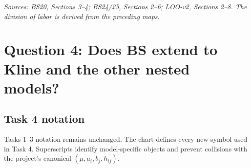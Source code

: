 \documentclass[11pt]{article}
\begin{document}
\textit{Sources: BS20, Sections 3--4; BS24/25, Sections 2--6; LOO-v2,
Sections 2--8.  The division of labor is derived from the preceding maps.}

\section{Question 4: Does BS extend to Kline and the other nested models?}

\subsection{Task 4 notation}

Tasks 1--3 notation remains unchanged.  The chart defines every new symbol
used in Task 4.  Superscripts identify model-specific objects and prevent
collisions with the project's canonical \((\mu,a_i,b_j,h_{ij})\).
\end{document}
